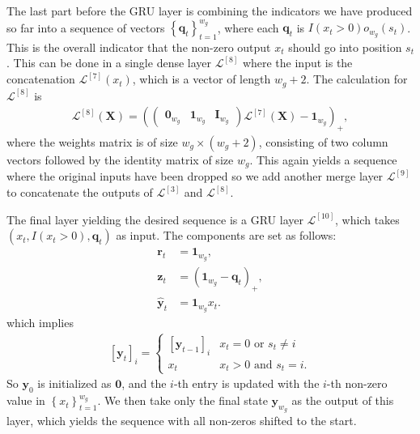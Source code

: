 \documentclass{somasmsc}
\begin{document}
The last part before the GRU layer is combining the indicators we have produced so far into a sequence of vectors $\left\{\pmb{q}_t\right\}_{t=1}^{w_g}$, where each $\pmb{q}_t$ is $I(x_t > 0)o_{w_g}(s_t)$. This is the overall indicator that the non-zero output $x_t$ should go into position $s_t$. This can be done in a single dense layer $\mathcal{L}^{\left[8\right]}$ where the input is the concatenation $\mathcal{L}^{\left[7\right]}\left(x_t\right)$, which is a vector of length $w_g + 2$. The calculation for $\mathcal{L}^{\left[8\right]}$ is
\begin{align*}
\mathcal{L}^{\left[8\right]}\left(\mathbf{X}\right) = \left(
\begin{pmatrix}
    \mathbf{0}_{w_g} & \mathbf{1}_{w_g} & \mathbf{I}_{w_g}
\end{pmatrix}
\mathcal{L}^{\left[7\right]}\left(\mathbf{X}\right)
- \mathbf{1}_{w_g}\right)_+,
\end{align*}
where the weights matrix is of size $w_g \times \left(w_g + 2\right)$, consisting of two column vectors followed by the identity matrix of size $w_g$. This again yields a sequence where the original inputs have been dropped so we add another merge layer $\mathcal{L}^{\left[9\right]}$ to concatenate the outputs of $\mathcal{L}^{\left[3\right]}$ and $\mathcal{L}^{\left[8\right]}$.

The final layer yielding the desired sequence is a GRU layer $\mathcal{L}^{\left[10\right]}$, which takes\\ $\left(x_t, I(x_t > 0), \pmb{q}_t\right)$ as input. The components are set as follows:
\begin{align*}
\pmb{r}_t &= \mathbf{1}_{w_g}, \\
\pmb{z}_t &= \left(\mathbf{1}_{w_g} - \pmb{q}_t\right)_+, \\
\hat{\pmb{y}}_t &= \mathbf{1}_{w_g} x_t.
\end{align*}
which implies
\begin{align*}
\left[\pmb{y}_t\right]_i =
\begin{cases}
    \left[\pmb{y}_{t-1}\right]_i & x_t = 0 \text{ or } s_t \neq i \\
    x_t & x_t > 0 \text{ and } s_t = i.
\end{cases}
\end{align*}
So $\pmb{y}_0$ is initialized as $\mathbf{0}$, and the $i$-th entry is updated with the $i$-th non-zero value in $\left\{x_t\right\}_{t=1}^{w_g}$. We then take only the final state $\pmb{y}_{w_g}$ as the output of this layer, which yields the sequence with all non-zeros shifted to the start.
\end{document}
